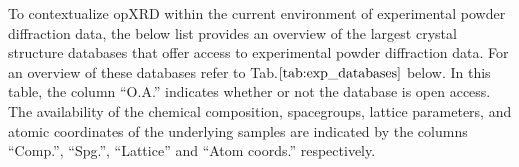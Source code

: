 To contextualize opXRD within the current environment of experimental powder diffraction data, the below list provides an overview of the largest crystal structure databases that offer access to experimental powder diffraction data. For an overview of these databases refer to Tab.$\eqref{tab:exp_databases}$ below. In this table, the column ``O.A.'' indicates whether or not the database is open access. The availability of the chemical composition, spacegroups, lattice parameters, and atomic coordinates of the underlying samples are indicated by the columns ``Comp.'', ``Spg.'', ``Lattice'' and ``Atom coords.'' respectively.

\begin{table}[!htb]
\centering
\caption{Overview of experimental powder diffraction databases}
\label{tab:exp_databases}
\end{table}

